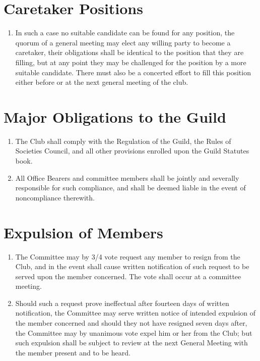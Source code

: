 \documentclass[10pt,a4paper]{report}
\begin{document}
		\section{Caretaker Positions}
		     \begin{enumerate}[label=\arabic*]
		       \item In such a case no suitable candidate can be found for any position, the quorum of a general meeting may elect any willing party to become a caretaker, their obligations shall be identical to the position that they are filling, but at any point they may be challenged for the position by a more suitable candidate. There must also be a concerted effort to fill this position either before or at the next general meeting of the club.
             \end{enumerate}
		\section{Major Obligations to the Guild}
			\begin{enumerate}[label=\arabic*]
				\item The Club shall comply with the Regulation of the Guild, the Rules of Societies Council, and all other provisions enrolled upon the Guild Statutes book.
				\item All Office Bearers and committee members shall be jointly and severally responsible for such compliance, and shall be deemed liable in the event of noncompliance therewith.
			\end{enumerate}

		\section{Expulsion of Members}
			\begin{enumerate}[label=\arabic*]
				\item The Committee may by 3/4 vote request any member to resign from the Club, and in the event shall cause written notification of such request to be served upon the member concerned. The vote shall occur at a committee meeting.
				\item Should such a request prove ineffectual after fourteen days of written notification, the Committee may serve written notice of intended expulsion of the member concerned and should they not have resigned seven days after, the Committee may by unanimous vote expel him or her from the Club; but such expulsion shall be subject to review at the next General Meeting with the member present and to be heard.
			\end{enumerate}
\end{document}
